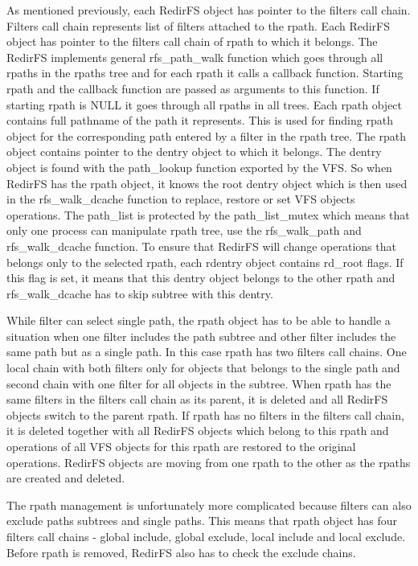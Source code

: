 \documentclass[oneside, 11pt, a4]{article}
\begin{document}
As mentioned previously, each RedirFS object has pointer to the filters call
chain. Filters call chain represents list of filters attached to the rpath. Each
RedirFS object has pointer to the filters call chain of rpath to which it
belongs. The RedirFS implements general rfs\_path\_walk function which goes
through all rpaths in the rpaths tree and for each rpath it calls a callback
function. Starting rpath and the callback function are passed as arguments to
this function. If starting rpath is NULL it goes through all rpaths in all
trees. Each rpath object contains full pathname of the path it represents. This
is used for finding rpath object for the corresponding path entered by a filter
in the rpath tree. The rpath object contains pointer to the dentry object to
which it belongs. The dentry object is found with the path\_lookup function
exported by the VFS. So when RedirFS has the rpath object, it knows the root
dentry object which is then used in the rfs\_walk\_dcache function to replace,
restore or set VFS objects operations. The path\_list is protected by the
path\_list\_mutex which means that only one process can manipulate rpath tree, use
the rfs\_walk\_path and rfs\_walk\_dcache function. To ensure that RedirFS will
change operations that belongs only to the selected rpath, each rdentry object
contains rd\_root flags. If this flag is set, it means that this dentry object
belongs to the other rpath and rfs\_walk\_dcache has to skip subtree with this
dentry.

While filter can select single path, the rpath object has to be able to handle a
situation when one filter includes the path subtree and other filter includes
the same path but as a single path. In this case rpath has two filters call
chains. One local chain with both filters only for objects that belongs to the
single path and second chain with one filter for all objects in the subtree.
When rpath has the same filters in the filters call chain as its parent, it is
deleted and all RedirFS objects switch to the parent rpath. If rpath has no
filters in the filters call chain, it is deleted together with all RedirFS
objects which belong to this rpath and operations of all VFS objects for this
rpath are restored to the original operations. RedirFS objects are moving from
one rpath to the other as the rpaths are created and deleted.

The rpath management is unfortunately more complicated because filters can also
exclude paths subtrees and single paths. This means that rpath object has four
filters call chains - global include, global exclude, local include and local
exclude. Before rpath is removed, RedirFS also has to check the exclude chains.
\end{document}
